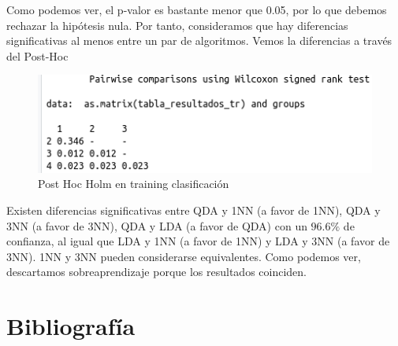 Como podemos ver, el p-valor es bastante menor que 0.05, por lo que debemos rechazar la hipótesis nula. Por tanto, consideramos que hay diferencias significativas al menos entre un par de algoritmos. Vemos la diferencias a través del Post-Hoc

\begin{figure}[H] %
	\centering
	\includegraphics[scale=0.6]{ph-tr-c.png}  %
	\caption{Post Hoc Holm en training clasificación} 
	\label{fig:ph-tr-c}
\end{figure}

Existen diferencias significativas entre QDA y 1NN (a favor de 1NN), QDA y 3NN (a favor de 3NN), QDA y LDA (a favor de QDA) con un $96.6\%$ de confianza, al igual que LDA y 1NN (a favor de 1NN) y LDA y 3NN (a favor de 3NN). 1NN y 3NN pueden considerarse equivalentes. Como podemos ver, descartamos sobreaprendizaje porque los resultados coinciden.

\newpage
\section{Bibliografía}




